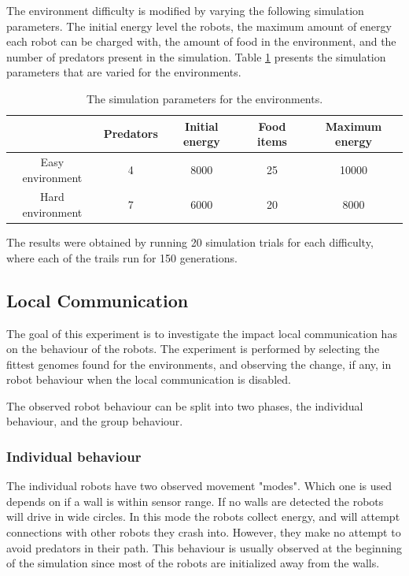 The environment difficulty is modified by varying the following simulation parameters.
The initial energy level the robots, the maximum amount of energy each robot can be charged with, the amount of food in the environment, and the number of predators present in the simulation.
Table \ref{tab:environment-difficulty} presents the simulation parameters that are varied for the environments.

\begin{table}[H]
	\centering

	\begin{tabular}{|c|c|c|c|c|}
		\hline  & \small{Predators} & \small{Initial energy} & \small{Food items} & \small{Maximum energy} \\ 
		\hline \small{Easy environment} & 4 & 8000 & 25 & 10000 \\ 
		\hline \small{Hard environment} & 7 & 6000 & 20 &8000 \\ 
		\hline 
		
	\end{tabular} 
	\caption{The simulation parameters for the environments.}
	\label{tab:environment-difficulty}
\end{table}

The results were obtained by running 20 simulation trials for each difficulty, where each of the trails run for 150 generations.

\newpage
\pagestyle{plain}



\newpage
\pagestyle{main}

\subsection{Local Communication}
\label{sec:local_communication}
The goal of this experiment is to investigate the impact local communication has on the behaviour of the robots.
The experiment is performed by selecting the fittest genomes found for the environments, and observing the change, if any, in robot behaviour when the local communication is disabled.



The observed robot behaviour can be split into two phases, the individual behaviour, and the group behaviour.

\subsubsection{Individual behaviour}
\label{sec:invdividual_behaviour}
The individual robots have two observed movement "modes".
Which one is used depends on if a wall is within sensor range.
If no walls are detected the robots will drive in wide circles.
In this mode the robots collect energy, and will attempt connections with other robots they crash into.
However, they make no attempt to avoid predators in their path.
This behaviour is usually observed at the beginning of the simulation since most of the robots are initialized away from the walls.


